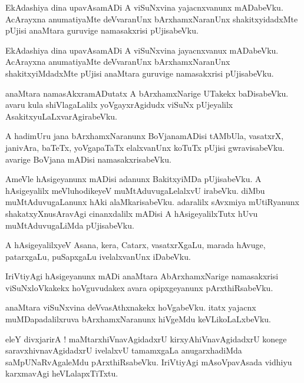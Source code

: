 \documentclass{article}
\begin{document}
\begin{mn}%
EkAdashiya dina upavAsamADi A viSuNxvina yajacnxvanunx mADabeVku. AcArayxna anumatiyaMte 
deVvaranUnx bArxhamxNaranUnx shakitxyidadxMte pUjisi anaMtara guruvige namasakxrisi pUjisabeVku.
\end{mn}

\begin{mn}%
EkAdashiya dina upavAsamADi A viSuNxvina jayacnxvanux mADabeVku. AcArayxna anumatiyaMte 
deVvaranUnx bArxhamxNaranUnx shakitxyiMdadxMte pUjisi anaMtara guruvige namasakxrisi pUjisabeVku.
\end{mn}

\begin{mn}%
anaMtara namasAkxramADutatx A bArxhamxNarige UTakekx baDisabeVku. avaru kula shiVlagaLalilx 
yoVgayxrAgidudx viSuNx pUjeyalilx AsakitxyuLaLxvarAgirabeVku.
\end{mn}

\begin{mn}%
A hadimUru jana bArxhamxNaranunx BoVjanamADisi tAMbUla, vasatxrX, janivAra, baTeTx, yoVgapaTaTx 
elalxvanUnx koTuTx pUjisi gwravisabeVku. avarige BoVjana mADisi namasakxrisabeVku.
\end{mn}

\begin{mn}%
AmeVle hAsigeyanunx mADisi adanunx BakitxyiMDa pUjisabeVku. A hAsigeyalilx meVluhodikeyeV 
muMtAduvugaLelalxvU irabeVku. diMbu muMtAduvugaLanunx hAki alaMkarisabeVku. adaralilx sAvxmiya 
mUtiRyanunx shakatxyXnusAravAgi cinanxdalilx mADisi A hAsigeyalilxTutx hUvu muMtAduvugaLiMda 
pUjisabeVku.
\end{mn}

\begin{mn}%
A hAsigeyalilxyeV Asana, kera, Catarx, vasatxrXgaLu, marada hAvuge, patarxgaLu, puSapxgaLu 
ivelalxvanUnx iDabeVku.
\end{mn}

\begin{mn}%
IriVtiyAgi hAsigeyanunx mADi anaMtara AbArxhamxNarige namasakxrisi viSuNxloVkakekx hoVguvudakex 
avara opipxgeyanunx pArxthiRsabeVku.
\end{mn}

\begin{mn}%
anaMtara viSuNxvina deVvasAthxnakekx hoVgabeVku. itatx yajacnx muMDapadalilxruva bArxhamxNaranunx 
hiVgeMdu keVLikoLaLxbeVku.
\end{mn}

\begin{mn}%
eleY divxjarirA ! maMtarxhiVnavAgidadxrU kirxyAhiVnavAgidadxrU konege saravxhivnavAgidadxrU 
ivelalxvU tamamxgaLa anugarxhadiMda saMpUNaRvAgaleMdu pArxthiRsabeVku. IriVtiyAgi mAsoVpavAsada 
vidhiyu karxmavAgi heVLalapxTiTxtu.
\end{mn}
\end{document}
